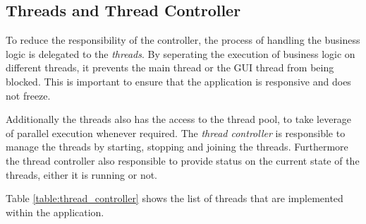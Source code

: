 \subsection{Threads and Thread Controller}
\label{subsec:thread_and_thread_controller}
To reduce the responsibility of the controller, the process of handling the business logic is delegated to the \textit{threads}. By seperating the execution of business logic on different threads, it prevents the main thread or the GUI thread from being blocked. This is important to ensure that the application is responsive and does not freeze.

Additionally the threads also has the access to the thread pool, to take leverage of parallel execution whenever required. The \textit{thread controller} is responsible to manage the threads by starting, stopping and joining the threads. Furthermore the thread controller also responsible to provide status on the current state of the threads, either it is running or not.

Table \ref{table:thread_controller} shows the list of threads that are implemented within the application.


